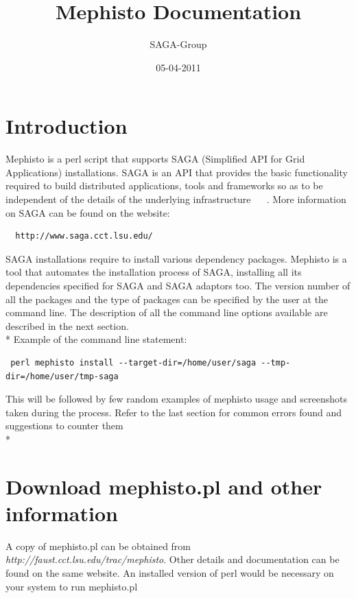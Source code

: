 \documentclass[a4paper,10pt]{article}
\newcommand{\jhanote}[1]{  {\textcolor{red}     { ***Shantenu: #1 }}}
\newcommand{\jhanote}[1]{}
\begin{document}
 \title{ \Large \vspace{-3.5em} Mephisto Documentation }
 
 \author{ SAGA-Group}
 \date{05-04-2011}
 \maketitle
 




\section*{Introduction}
Mephisto is a perl script that supports SAGA (Simplified API for Grid Applications) 
installations. SAGA is an API that provides the basic functionality required to build 
distributed applications, tools and frameworks so as to be independent of the details 
of the underlying infrastructure ~\cite{saga-home} ~\cite{saga-tools}. More information
on SAGA can be found on the website:
\begin{verbatim}
  http://www.saga.cct.lsu.edu/
\end{verbatim}
SAGA installations require to install various dependency packages. 
Mephisto is a tool that automates the installation process of SAGA, installing 
all its dependencies specified for SAGA and SAGA adaptors too.  
The version number of all the packages and the type of packages can 
be specified by the user at the command line. The description 
of all the command line options available are described 
in the next section.\\*
Example of the command line statement: 
\begin{verbatim} perl mephisto install --target-dir=/home/user/saga --tmp-dir=/home/user/tmp-saga \end{verbatim} 
This will be followed by few random examples of mephisto usage and screenshots taken during the
process. Refer to the last section for common errors found and suggestions to counter them\\*
\section*{Download mephisto.pl and other information}
A copy of mephisto.pl can be obtained from \emph{http://faust.cct.lsu.edu/trac/mephisto}. 
Other details and documentation can be found on the same website. 
An installed version of perl would be necessary on your system to run mephisto.pl 
\end{document}

